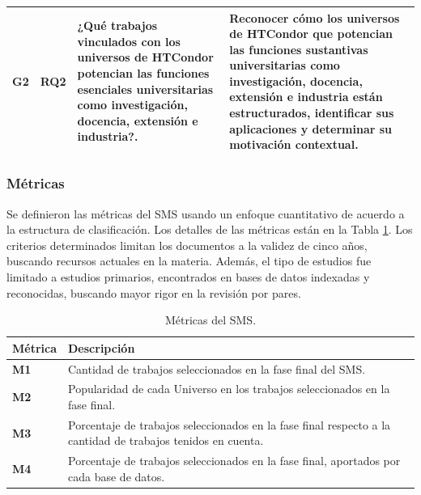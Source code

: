 \begin{table}[htbp]
\begin{tabular}{p{1cm}p{1.7cm}p{6.8cm}p{6.8cm}}
		\addlinespace[0.8em]
		G2                & RQ2                                & ¿Qué trabajos vinculados con los universos de HTCondor potencian las funciones esenciales universitarias como investigación, docencia, extensión e industria?.                                                                                                                                                                           & Reconocer cómo los universos de HTCondor que potencian las funciones sustantivas universitarias como investigación, docencia, extensión e industria están estructurados, identificar sus aplicaciones y determinar su motivación contextual.                                                                                                                                                           \\
		\bottomrule
	\end{tabular}
\end{table}

\subsubsection{Métricas}
Se definieron las métricas del SMS usando un enfoque cuantitativo de acuerdo a la estructura de clasificación. Los detalles de las métricas están en la Tabla \ref{table:Metrics}. Los criterios determinados limitan los documentos a la validez de cinco años, buscando recursos actuales en la materia. Además, el tipo de estudios fue limitado a estudios primarios, encontrados en bases de datos indexadas y reconocidas, buscando mayor rigor en la revisión por pares.

\begin{table}[htbp]
	\centering
	\caption{Métricas del SMS.}
	\label{table:Metrics}
	\renewcommand{\arraystretch}{1}  %
	\begin{tabular}{p{1cm}p{6.8cm}}
		\toprule
		\textbf{Métrica} & \textbf{Descripción}                                                                                        \\
		\midrule
		\textbf{M1}      & Cantidad de trabajos seleccionados en la fase final del SMS.                                                \\
		\addlinespace[0.8em]
		\textbf{M2}      & Popularidad de cada Universo en los trabajos seleccionados en la fase final.                                \\
		\addlinespace[0.8em]
		\textbf{M3}      & Porcentaje de trabajos seleccionados en la fase final respecto a la cantidad de trabajos tenidos en cuenta. \\
		\addlinespace[0.8em]
		\textbf{M4}      & Porcentaje de trabajos seleccionados en la fase final, aportados por cada base de datos.                    \\
		\bottomrule
	\end{tabular}
\end{table}

